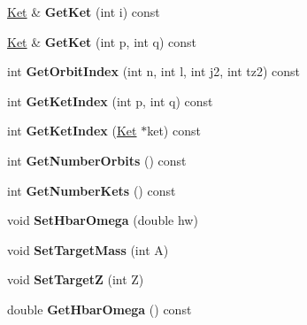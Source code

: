 \begin{DoxyCompactItemize}
\mbox{\label{classModelSpace_aae1886b73d80d7696d5292bd4c21ff72}} 
\hyperlink{classKet}{Ket} \& {\bfseries Get\+Ket} (int i) const
\item 
\mbox{\label{classModelSpace_aa4244ce1619c767fb3f28ef03f4ddae9}} 
\hyperlink{classKet}{Ket} \& {\bfseries Get\+Ket} (int p, int q) const
\item 
\mbox{\label{classModelSpace_a6730013bbbdb0f6a52dcd78c895cf573}} 
int {\bfseries Get\+Orbit\+Index} (int n, int l, int j2, int tz2) const
\item 
\mbox{\label{classModelSpace_a946e5f346c9bb18c4da46a9b1798aea5}} 
int {\bfseries Get\+Ket\+Index} (int p, int q) const
\item 
\mbox{\label{classModelSpace_ad9d8b864520540f4e2ec2ee7c34bd205}} 
int {\bfseries Get\+Ket\+Index} (\hyperlink{classKet}{Ket} $\ast$ket) const
\item 
\mbox{\label{classModelSpace_a2db014dd320337a7abe074fd1f214295}} 
int {\bfseries Get\+Number\+Orbits} () const
\item 
\mbox{\label{classModelSpace_acf050d2fb6ceecda016ae470cfe9f51d}} 
int {\bfseries Get\+Number\+Kets} () const
\item 
\mbox{\label{classModelSpace_abc4f6a563b71977d1e0a99eb5367a2d7}} 
void {\bfseries Set\+Hbar\+Omega} (double hw)
\item 
\mbox{\label{classModelSpace_ab29013a1b7b4b8b26d5905f97c135931}} 
void {\bfseries Set\+Target\+Mass} (int A)
\item 
\mbox{\label{classModelSpace_a7ad596c6f8c6c850672e1699b12901e4}} 
void {\bfseries Set\+TargetZ} (int Z)
\item 
\mbox{\label{classModelSpace_a92dfc59701fb74edf16d21d2f3acef40}} 
double {\bfseries Get\+Hbar\+Omega} () const
\item 
\mbox{\label{classModelSpace_a32251507f0c5b74de9629e86446cb528}} 

\end{DoxyCompactItemize}
